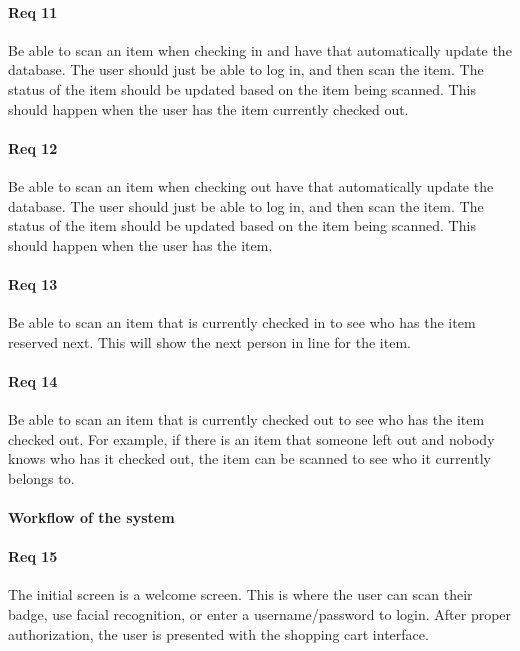 \documentclass[10pt, onecolumn, twoside, peerreview]{IEEEtran}
\begin{document}
\paragraph*{Req 11} Be able to scan an item when checking in and have that automatically update the database. The user should just be able
to log in, and then scan the item. The status of the item should be updated based on the item being scanned. This
should happen when the user has the item currently checked out.\\

\paragraph*{Req 12} Be able to scan an item when checking out have that automatically update the database. The user should just be able to
log in, and then scan the item. The status of the item should be updated based on the item being scanned. This should
happen when the user has the item.\\

\paragraph*{Req 13} Be able to scan an item that is currently checked in to see who has the item reserved next. This will show the next
person in line for the item.\\

\paragraph*{Req 14} Be able to scan an item that is currently checked out to see who has the item checked out. For example, if there is an
item that someone left out and nobody knows who has it checked out, the item can be scanned to see who it currently
belongs to.\\

\paragraph*{Workflow of the system}

\paragraph*{Req 15} The initial screen is a welcome screen. This is where the user can scan their badge, use facial recognition, or enter a
username/password to login. After proper authorization, the user is presented with the shopping cart interface.\\
\end{document}
